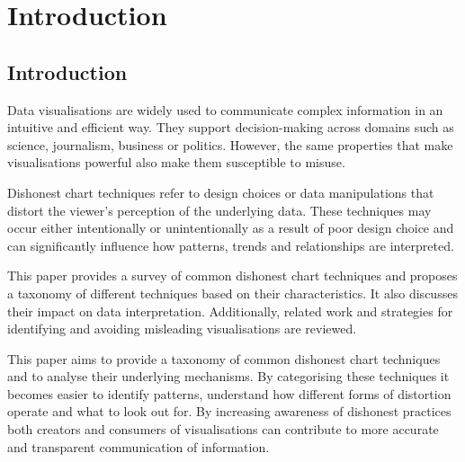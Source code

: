 %
%
% 
% 
% 


\chapter{Introduction}

\label{chap:Intro}

\section{Introduction}

Data visualisations are widely used to communicate complex information in an intuitive and efficient way. They support decision-making across domains such as science, journalism, business or politics. However, the same properties that make visualisations powerful also make them susceptible to misuse.

Dishonest chart techniques refer to design choices or data manipulations that distort the viewer's perception of the underlying data. These techniques may occur either intentionally or unintentionally as a result of poor design choice and can significantly influence how patterns, trends and relationships are interpreted.

This paper provides a survey of common dishonest chart techniques and proposes a taxonomy of different techniques based on their characteristics. It also discusses their impact on data interpretation. Additionally, related work and strategies for identifying and avoiding misleading visualisations are reviewed.

This paper aims to provide a taxonomy of common dishonest chart techniques and to analyse their underlying mechanisms. By categorising these techniques it becomes easier to identify patterns, understand how different forms of distortion operate and what to look out for. By increasing awareness of dishonest practices both creators and consumers of visualisations can contribute to more accurate and transparent communication of information.



